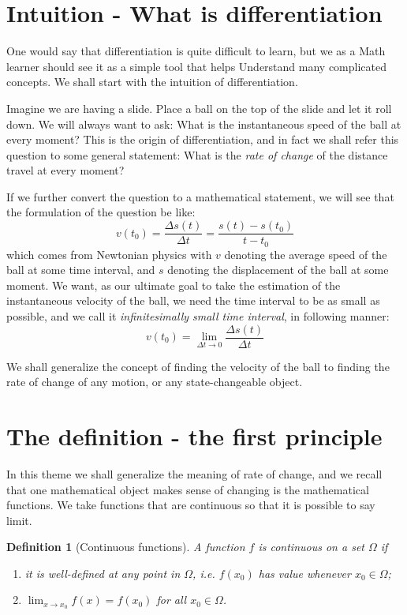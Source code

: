 \documentclass[12pt]{article}
\newtheorem*{definition}{Definition}
\begin{document}
\section*{Intuition - What is differentiation}
    One would say that differentiation is quite difficult to learn, but we as a Math learner should see it as a simple tool that helps Understand many complicated concepts. We shall start with the intuition of differentiation.

    Imagine we are having a slide. Place a ball on the top of the slide and let it roll down. We will always want to ask: What is the instantaneous speed of the ball at every moment? This is the origin of differentiation, and in fact we shall refer this question to some general statement: What is the \textit{rate of change} of the distance travel at every moment?

    If we further convert the question to a mathematical statement, we will see that the formulation of the question be like: $$v(t_0)=\frac{\Delta s(t)}{\Delta t}=\frac{s(t)-s(t_0)}{t-t_0}$$ which comes from Newtonian physics with $v$ denoting the average speed of the ball at some time interval, and $s$ denoting the displacement of the ball at some moment. We want, as our ultimate goal to take the estimation of the instantaneous velocity of the ball, we need the time interval to be as small as possible, and we call it \textit{infinitesimally small time interval}, in following manner: $$v(t_0)=\lim_{\Delta t \to 0}\frac{\Delta s(t)}{\Delta t}$$

    We shall generalize the concept of finding the velocity of the ball to finding the rate of change of any motion, or any state-changeable object.

    \section*{The definition - the first principle}
    In this theme we shall generalize the meaning of rate of change, and we recall that one mathematical object makes sense of changing is the mathematical functions. We take functions that are continuous so that it is possible to say limit.

    \begin{definition}[Continuous functions]
        A function $f$ is continuous on a set $\Omega$ if\begin{enumerate}
            \item it is well-defined at any point in $\Omega$, i.e. $f(x_0)$ has value whenever $x_0\in\Omega$;
            \item $\lim_{x\to x_0}f(x)=f(x_0)$ for all $x_0\in\Omega$.
        \end{enumerate}
    \end{definition}
\end{document}
